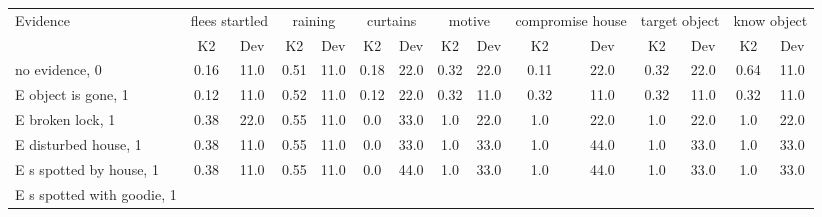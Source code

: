 \begin{table}\begin{tabular}{l|cc|cc|cc|cc|cc|cc|cc}\toprule\multirow{2}{*}{Evidence} & \multicolumn{2}{c}{flees startled}& \multicolumn{2}{c}{raining}& \multicolumn{2}{c}{curtains}& \multicolumn{2}{c}{motive}& \multicolumn{2}{c}{compromise house}& \multicolumn{2}{c}{target object}& \multicolumn{2}{c}{know object}\\& {K2} & {Dev}& {K2} & {Dev}& {K2} & {Dev}& {K2} & {Dev}& {K2} & {Dev}& {K2} & {Dev}& {K2} & {Dev}\\\midrule
no evidence, 0 & \cellcolor{Bittersweet}0.16&\cellcolor{Bittersweet}11.0&\cellcolor{Bittersweet}0.51&\cellcolor{Bittersweet}11.0&\cellcolor{Bittersweet}0.18&\cellcolor{Bittersweet}22.0&\cellcolor{Bittersweet}0.32&\cellcolor{Bittersweet}22.0&\cellcolor{Bittersweet}0.11&\cellcolor{Bittersweet}22.0&\cellcolor{Bittersweet}0.32&\cellcolor{Bittersweet}22.0&\cellcolor{Bittersweet}0.64&\cellcolor{Bittersweet}11.0\\E object is gone, 1 & \cellcolor{Bittersweet}0.12&\cellcolor{Bittersweet}11.0&\cellcolor{Bittersweet}0.52&\cellcolor{Bittersweet}11.0&\cellcolor{Bittersweet}0.12&\cellcolor{Bittersweet}22.0&\cellcolor{Bittersweet}0.32&\cellcolor{Bittersweet}11.0&\cellcolor{Bittersweet}0.32&\cellcolor{Bittersweet}11.0&\cellcolor{Bittersweet}0.32&\cellcolor{Bittersweet}11.0&\cellcolor{Bittersweet}0.32&\cellcolor{Bittersweet}11.0\\E broken lock, 1 & \cellcolor{Bittersweet}0.38&\cellcolor{Bittersweet}22.0&\cellcolor{Bittersweet}0.55&\cellcolor{Bittersweet}11.0&\cellcolor{Bittersweet}0.0&\cellcolor{Bittersweet}33.0&\cellcolor{Bittersweet}1.0&\cellcolor{Bittersweet}22.0&\cellcolor{Bittersweet}1.0&\cellcolor{Bittersweet}22.0&\cellcolor{Bittersweet}1.0&\cellcolor{Bittersweet}22.0&\cellcolor{Bittersweet}1.0&\cellcolor{Bittersweet}22.0\\E disturbed house, 1 & \cellcolor{Bittersweet}0.38&\cellcolor{Bittersweet}11.0&\cellcolor{Bittersweet}0.55&\cellcolor{Bittersweet}11.0&\cellcolor{Bittersweet}0.0&\cellcolor{Bittersweet}33.0&\cellcolor{Bittersweet}1.0&\cellcolor{Bittersweet}33.0&\cellcolor{Bittersweet}1.0&\cellcolor{Bittersweet}44.0&\cellcolor{Bittersweet}1.0&\cellcolor{Bittersweet}33.0&\cellcolor{Bittersweet}1.0&\cellcolor{Bittersweet}33.0\\E s spotted by house, 1 & \cellcolor{Bittersweet}0.38&\cellcolor{Bittersweet}11.0&\cellcolor{Bittersweet}0.55&\cellcolor{Bittersweet}11.0&\cellcolor{Bittersweet}0.0&\cellcolor{Bittersweet}44.0&\cellcolor{Bittersweet}1.0&\cellcolor{Bittersweet}33.0&\cellcolor{Bittersweet}1.0&\cellcolor{Bittersweet}44.0&\cellcolor{Bittersweet}1.0&\cellcolor{Bittersweet}33.0&\cellcolor{Bittersweet}1.0&\cellcolor{Bittersweet}33.0\\E s spotted with goodie, 1 & 
\end{tabular}
\end{table}

